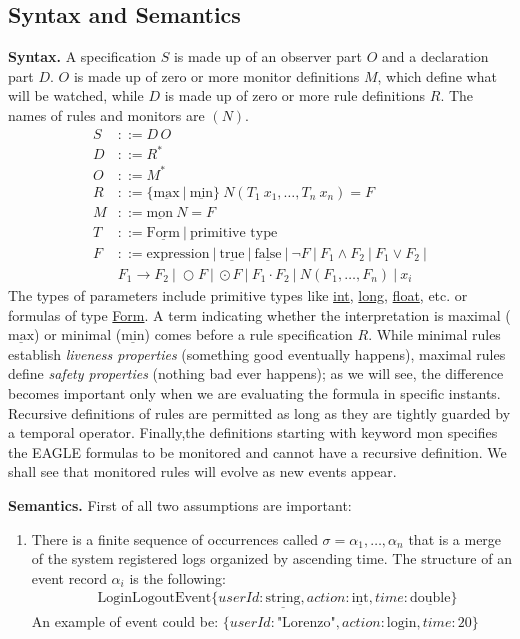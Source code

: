\documentclass[english]{article}
\begin{document}
\subsection{Syntax and Semantics}
\textbf{Syntax.}
A specification $S$ is made up of an observer part $O$ and a declaration part $D$. $O$ is made up of zero or more monitor definitions $M$, which define what will be watched, while $D$ is made up of zero or more rule definitions $R$. The names of rules and monitors are $(N)$.
\begin{align*}
    S &::= D \, O \\
    D &::= R^* \\
    O &::= M^* \\
    R &::= \{\underline{\text{max}}\ |\ \underline{\text{min}} \}\ N(T_1\ x_1, \ldots, T_n\ x_n) = F \\
    M &::= \underline{\text{mon}}\ N = F \\
    T &::= \underline{\text{Form}}\ |\ \text{primitive type} \\
    F &::= \text{expression}\ |\ \underline{\text{true}}\ |\ \underline{\text{false}}\ |\ \neg F\ |\ F_1 \land F_2\ |\ F_1 \lor F_2\ |\\
            &F_1 \rightarrow F_2\ |\ \bigcirc F\ |\ \odot F\ |\ F_1 \cdot F_2\ |\ N(F_1, \ldots, F_n)\ |\ x_i
\end{align*}
The types of parameters include primitive types like \underline{int}, \underline{long}, \underline{float}, etc. or formulas of type \underline{Form}.
A term indicating whether the interpretation is maximal ($\underline{\text{max}}$) or minimal ($\underline{\text{min}}$) comes before a rule specification $R$. While minimal rules establish \textit{liveness properties} (something good eventually happens), maximal rules define \textit{safety properties} (nothing bad ever happens); as we will see, the difference becomes important only when we are evaluating the formula in specific instants. Recursive definitions of rules are permitted as long as they are tightly guarded by a temporal operator. Finally,the definitions starting with keyword $\underline{\text{mon}}$ specifies the EAGLE formulas to be monitored and cannot have a recursive definition. We shall see that monitored rules will evolve as new events appear.

\textbf{Semantics.} First of all two assumptions are important:\begin{enumerate}
    \item There is a finite sequence of occurrences called $\sigma=\alpha_{1},\ldots ,\alpha_{n}$ that is a merge of the system registered logs organized by ascending time. 
    The structure of an event record $\alpha_i$ is the following:
    \begin{align*}
        & \text{LoginLogoutEvent}\{userId:\underline{\text{string}},action: \underline{\text{int}}, time: \underline{\text{double}}\} 
    \end{align*}
    An example of event could be: $\{userId:\text{"Lorenzo"},action:\text{login},time:\text{20}\}$
\end{enumerate}
\end{document}
